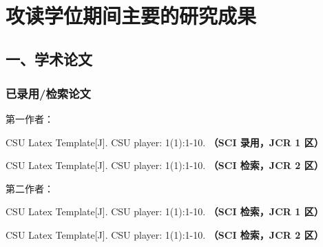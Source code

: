 
{~}
\vspace{-9pt}
\section{攻读学位期间主要的研究成果} %

\ifblindreview
\fi
\vspace{11pt}
\subsection*{一、学术论文}

\ifblindreview



\subsubsection*{已录用/检索论文}
第一作者：
\begin{enumerate}[label={[\arabic*]},itemindent=2em,wide]
	\item CSU Latex Template[J]. CSU player: 1(1):1-10. {\bfseries \heiti（SCI 录用，JCR 1 区）}
	\item CSU Latex Template[J]. CSU player: 1(1):1-10. {\bfseries \heiti（SCI 检索，JCR 2 区）}
\end{enumerate}
第二作者：
\begin{enumerate}[label={[\arabic*]},itemindent=2em,wide]
	\item CSU Latex Template[J]. CSU player: 1(1):1-10. {\bfseries \heiti（SCI 检索，JCR 1 区）}
	\item CSU Latex Template[J]. CSU player: 1(1):1-10. {\bfseries \heiti（SCI 检索，JCR 2 区）}
\end{enumerate}
